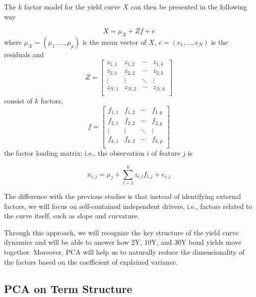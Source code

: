 The $k$ factor model for the yield curve $X$ can then be presented in the following way

\begin{equation}
X = \mu_ X + Zf + e
\end{equation}
\noindent
where $\mu_X = (\mu_1,\ldots, \mu_p)$ is the mean vector of $X$, $e = (e_1,\ldots, e_N )$ is the residuals and
\begin{equation}
Z =
\begin{bmatrix}
	z_{1,1} & z_{1,2} & \cdots & z_{1,k} \\
	z_{2,1} & z_{2,2} & \cdots & z_{2,k} \\
	\vdots & \vdots & \ddots & \vdots \\
	z_{N,1} & z_{N,2} & \cdots & z_{N,k} \\
\end{bmatrix}
\end{equation}
consist of $k$ factors,
\begin{equation}
f =
\begin{bmatrix}
	f_{1,1} & f_{1,2} & \cdots & f_{1,p} \\
	f_{2,1} & f_{2,2} & \cdots & f_{2,p} \\
	\vdots & \vdots & \ddots & \vdots \\
	f_{k,1} & f_{k,2} & \cdots & f_{k,p} \\
\end{bmatrix}
\end{equation}
the factor loading matrix; i.e., the observation $i$ of feature $j$ is

\begin{equation}
x_{i,j} = \mu_j + \sum_{l=1}^k z_{i,l}f_{l,j} + e_{i,j}
\end{equation}

The difference with the previous studies is that instead of identifying external factors, we will focus on self-contained independent drivers, i.e., factors related to the curve itself, such as slope and curvature.

Through this approach, we will recognize the key structure of the yield curve dynamics and will be able to answer how 2Y, 10Y, and 30Y bond yields move together. Moreover, PCA will help us to naturally reduce the dimensionality of the factors based on the coefficient of explained variance.

\subsection{PCA on Term Structure}


